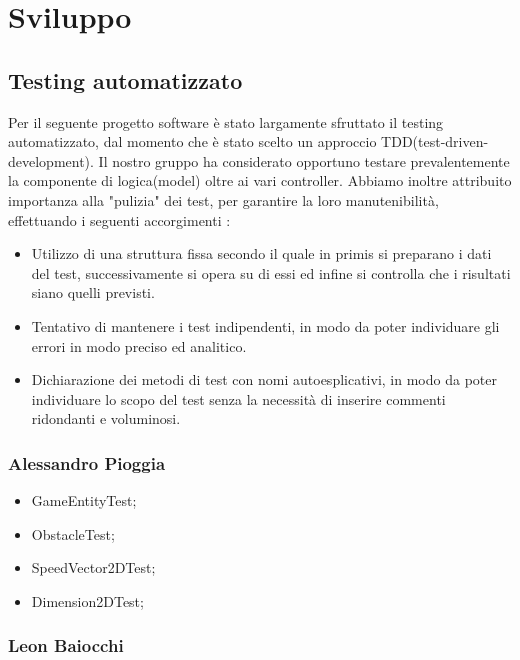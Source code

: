 
\chapter{Sviluppo}
\section{Testing automatizzato}

Per il seguente progetto software è stato largamente sfruttato il testing automatizzato, dal momento che è stato scelto un approccio TDD(test-driven-development). Il nostro gruppo ha considerato opportuno testare prevalentemente la componente di logica(model) oltre ai vari controller.
Abbiamo inoltre attribuito importanza alla "pulizia" dei test, per garantire la loro manutenibilità, effettuando i seguenti accorgimenti : 

\begin{itemize}
	\item Utilizzo di una struttura fissa secondo il quale in primis si preparano i dati del test, successivamente si opera su di essi ed infine si controlla che i risultati siano quelli previsti. 
	\item Tentativo di mantenere i test indipendenti, in modo da poter individuare gli errori in modo preciso ed analitico.
	\item Dichiarazione dei metodi di test con nomi autoesplicativi, in modo da poter individuare lo scopo del test senza la necessità di inserire commenti ridondanti e voluminosi.
\end{itemize}

\subsection*{Alessandro Pioggia}

\begin{itemize}
	\item GameEntityTest;
	\item ObstacleTest;
	\item SpeedVector2DTest;
	\item Dimension2DTest;
\end{itemize}

\subsection*{Leon Baiocchi}

